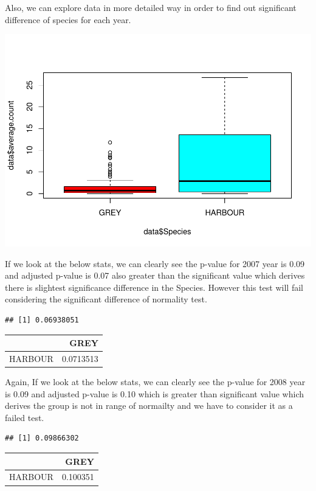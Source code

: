 \documentclass[
]{article}
\begin{document}
Also, we can explore data in more detailed way in order to find out
significant difference of species for each year.

\includegraphics{Statistical-analysis-in-RStudio_files/figure-latex/unnamed-chunk-22-1.pdf}

If we look at the below stats, we can clearly see the p-value for 2007
year is 0.09 and adjusted p-value is 0.07 also greater than the
significant value which derives there is slightest significance
difference in the Species. However this test will fail considering the
significant difference of normality test.

\begin{verbatim}
## [1] 0.06938051
\end{verbatim}

\begin{longtable}[]{@{}lr@{}}
\toprule
& GREY\tabularnewline
\midrule
\endhead
HARBOUR & 0.0713513\tabularnewline
\bottomrule
\end{longtable}

Again, If we look at the below stats, we can clearly see the p-value for
2008 year is 0.09 and adjusted p-value is 0.10 which is greater than
significant value which derives the group is not in range of normailty
and we have to consider it as a failed test.

\begin{verbatim}
## [1] 0.09866302
\end{verbatim}

\begin{longtable}[]{@{}lr@{}}
\toprule
& GREY\tabularnewline
\midrule
\endhead
HARBOUR & 0.100351\tabularnewline
\bottomrule
\end{longtable}
\end{document}
